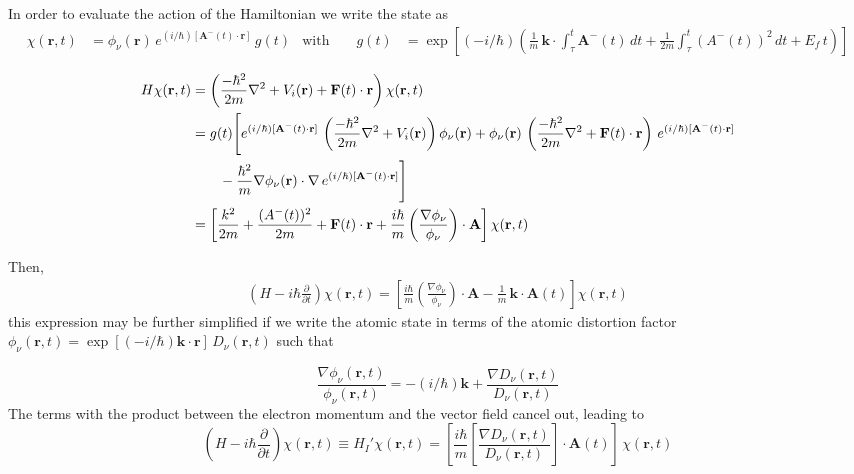 In order to evaluate the action of the Hamiltonian we write the state as
\begin{align*}
  \chi (\bm{r},t) &= \phi_{\nu}(\bm{r})\, e^{(i/\hbar) [\bm{A}^{-}(t)\cdot \bm{r}]}\, g(t)
  &\text{with } &&
  g(t)&= \exp{\left[(-i/\hbar) \left( \frac{1}{m}\, \bm{k} \cdot \int_{\tau}^{t}  \bm{A}^{-}(t)\, dt + \frac{1}{2m}\int_{\tau}^{t} \left( A^{-}(t) \right)^{2}\, dt + E_{f}\,t \right)\right]}
\end{align*}

\begin{align}
  H \chi (\mathbf{r},t) &= \left( \frac{-\hbar^{2}}{2m} \nabla^{2} + V_{i}(\mathbf{r}) + \mathbf{F}(t) \cdot \mathbf{r}  \right) \chi (\mathbf{r},t) \notag \\
&=  g(t) \Bigg[ e^{(i/\hbar) [\mathbf{A}^{-}(t)\cdot \mathbf{r}]}\, \left( \frac{-\hbar^{2}}{2m} \nabla^{2} +V_{i}(\mathbf{r}) \right)  \phi_{\nu}(\mathbf{r}) +  \phi_{\nu}(\mathbf{r})\, \left( \frac{-\hbar^{2}}{2m} \nabla^{2} + \mathbf{F}(t) \cdot \mathbf{r} \right)\, e^{(i/\hbar) [\mathbf{A}^{-}(t)\cdot \mathbf{r}]} \notag \\
&\qquad - \frac{\hbar^{2}}{m}  \nabla \phi_{\nu}(\mathbf{r}) \cdot \nabla \, e^{(i/\hbar) [\mathbf{A}^{-}(t)\cdot \mathbf{r}]}  \Bigg] \notag \\
&= \left[ \frac{k^{2}}{2m} +  \frac{(A^{-}(t))^{2}}{2m} +  \mathbf{F}(t)\cdot\mathbf{r} + \frac{i \hbar}{m} \left( \frac{\nabla \phi_{\nu}}{\phi_{\nu}} \right) \cdot \mathbf{A} \right] \chi (\mathbf{r},t) 
\end{align}

Then,
\begin{align*}
  \left( H - i \hbar \frac{\partial }{\partial t} \right) \chi (\bm{r},t) = \left[\frac{i \hbar}{m} \left( \frac{\nabla \phi_{\nu}}{\phi_{\nu}} \right) \cdot \bm{A} - \frac{1}{m}\,\bm{k}\cdot \bm{A}(t) \right] \chi (\bm{r},t)
\end{align*}
this expression may be further simplified if we write the atomic state in terms of the atomic distortion factor $\phi_{\nu}(\bm{r},t) = \exp{[(-i/\hbar) \bm{k}\cdot\bm{r} ]} \,D_{\nu} (\bm{r},t)$ such that  

\begin{equation*}
\frac{\nabla \phi_{\nu}(\bm{r},t)}{\phi_{\nu}(\bm{r},t)} = -(i/\hbar) \bm{k} + \frac{\nabla D_{\nu}(\bm{r},t)}{D_{\nu}(\bm{r},t)}
\end{equation*}
The terms with the product between the electron momentum and the vector field cancel out, leading to
\begin{equation}\label{Q:CV2-perturb}
  \left( H - i \hbar \frac{\partial }{\partial t} \right) \chi (\bm{r},t) \equiv H_{I}' \chi (\bm{r},t) = \left[\frac{i \hbar}{m}\left[ \frac{\nabla D_{\nu} (\bm{r},t)}{D_{\nu}(\bm{r},t)} \right]  \cdot \bm{A}(t) \right]\, \chi (\bm{r},t)
\end{equation}

